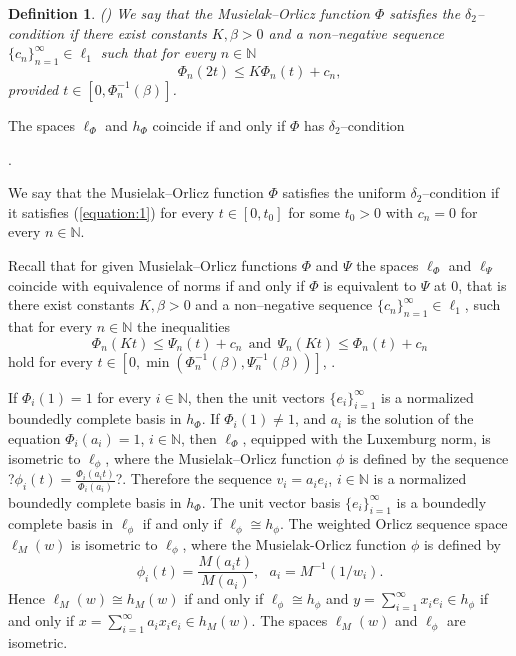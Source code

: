 \documentclass[12pt]{article}
\theoremstyle{thmstyleone}%
\theoremstyle{thmstyletwo}%
\theoremstyle{thmstylethree}%
\newtheorem{definition}{Definition}%
\begin{document}
\begin{definition}\label{definition:9}(\cite{Kaminska})
	We say that the Musielak--Orlicz function $\Phi$ satisfies the $\delta_2$--condition
	if there exist constants $K,\beta >0$ and a non--negative sequence
	$\{c_n\}_{n=1}^\infty\in\ell_1$ such that for every $n\in\mathbb{N}$
	\begin{equation}\label{equation:1} 
		\Phi_n(2t)\leq K\Phi_n(t)+c_n, 
	\end{equation} 
	provided $t\in [0,\Phi_n^{-1}(\beta)]$.
\end{definition}
The spaces $\ell_\Phi$ and $h_\Phi$ coincide if and only if $\Phi$ has
$\delta_2$--condition {\cite{Kaminska82}.

We say that the Musielak--Orlicz function $\Phi$ satisfies the uniform
$\delta_2$--condition if it satisfies (\ref{equation:1}) for every $t\in
[0,t_0]$ for some $t_0>0$ with $c_n=0$ for every $n\in\mathbb{N}$.

Recall that for given Musielak--Orlicz functions $\Phi$ and $\Psi$ the spaces
$\ell_\Phi$ and $\ell_\Psi$ coincide with equivalence of norms if and only if
$\Phi$ is equivalent to $\Psi$ at $0$, that is there exist constants
$K,\beta >0$ and a non--negative sequence $\{c_n\}_{n=1}^\infty\in\ell_1$,
such that for every $n\in\mathbb{N}$ the inequalities
$$ 
\Phi_n(Kt)\le \Psi_n(t)+c_n \ \ \mbox{and} \ \
\Psi_n(Kt)\le \Phi_n(t)+c_n 
$$
hold for every $t\in [0,\min(\Phi_n^{-1}(\beta),\Psi_n^{-1}(\beta))]$,
\cite{Kaminska,Maleev-Zlatanov-02}.

If $\Phi_i(1)=1$ for every $i\in\mathbb{N}$, then the unit vectors
$\{e_i\}_{i=1}^\infty$ is a normalized boundedly complete basis in
$h_\Phi$. If $\Phi_i(1)\not=1$, and $a_i$ is the solution of the
equation $\Phi_i(a_i)=1$, $i\in\mathbb{N}$, then $\ell_\Phi$, equipped with
the Luxemburg norm, is isometric to $\ell_\phi$, where
the Musielak--Orlicz function $\phi$ is defined by the sequence
?$\phi_i(t)=\displaystyle\frac{\Phi_i(a_it)}{\Phi_i(a_i)}$?. Therefore the sequence
$v_i=a_ie_i$, $i\in\mathbb{N}$ is a normalized boundedly complete basis in
$h_\Phi$. The unit vector basis $\{e_i\}_{i=1}^\infty$ is a
boundedly complete basis in $\ell_\phi$ if and only if $\ell_\phi\cong h_\phi$.
The weighted Orlicz sequence space $\ell_M(w)$ is isometric to
$\ell_\phi$, where the Musielak-Orlicz function $\phi$ is defined by
$$
\phi_i(t)=\displaystyle\frac{M(a_it)}{M(a_i)},\ \ \
a_i=M^{-1}(1/w_i).
$$ 
Hence $\ell_M(w)\cong h_M(w)$ if and only if
$\ell_\phi\cong h_\phi$ and $y=\sum_{i=1}^\infty x_ie_i\in h_\phi$
if and only if $x=\sum_{i=1}^\infty a_ix_ie_i\in h_M(w)$. The spaces
$\ell_M(w)$ and $\ell_\phi$ are isometric.

}
\end{document}

